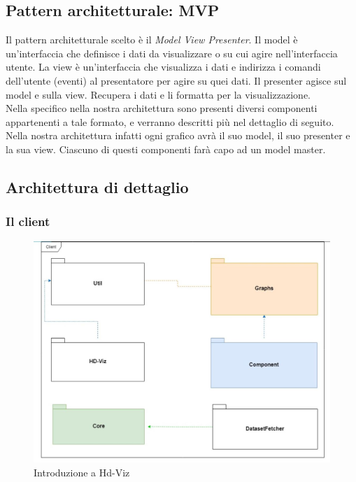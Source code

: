\documentclass[../manuale_sviluppatore.tex]{subfiles}
\begin{document}
\subsection{Pattern architetturale: MVP}
Il pattern architetturale scelto è il \emph{Model View Presenter}. 
Il model è un'interfaccia che definisce i dati da visualizzare o su cui agire nell'interfaccia utente.
La view è un'interfaccia che visualizza i dati e indirizza i comandi dell'utente (eventi) al presentatore per agire su quei dati.
Il presenter agisce sul model e sulla view. Recupera i dati e li formatta per la visualizzazione.\\
Nella specifico nella nostra architettura sono presenti diversi componenti appartenenti a tale formato, e verranno descritti più nel dettaglio di seguito.\\
Nella nostra architettura infatti ogni grafico avrà il suo model,  il suo presenter e la sua view. Ciascuno di questi componenti 
farà capo ad un model master.

\subsection{Architettura di dettaglio}
\subsubsection{Il client}

\begin{figure}[H]
	\centering
	\includegraphics[width=18cm]{img/core.jpg}
	\caption{Introduzione a Hd-Viz}
\end{figure}
\end{document}
